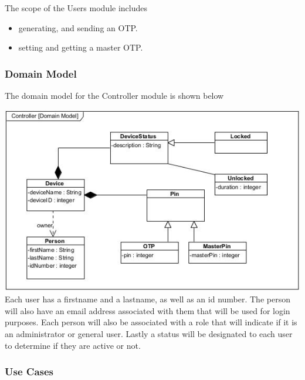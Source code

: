 \documentclass[a4paper,12pt]{article}
\begin{document}
	{\noindent}The scope of the Users module includes
	\begin{itemize}
		\item generating, and sending an OTP.
		\item setting and getting a master OTP.
	\end{itemize}
	
	\newpage
	\subsubsection{Domain Model}
	The domain model for the Controller module is shown below
	
	\includegraphics[width=1\textwidth]{./Pictures/UML/controllerDomainModel.jpg}\\[1.5cm]	
	
	{\noindent}Each user has a firstname and a lastname, as well as an id number. The person will also have an email address associated with them that will be used for login purposes. Each person will also be associated with a role that will indicate if it is an administrator or general user. Lastly a status will be designated to each user to determine if they are active or not.	
	
	\newpage
	\subsubsection{Use Cases}
	
\end{document}
